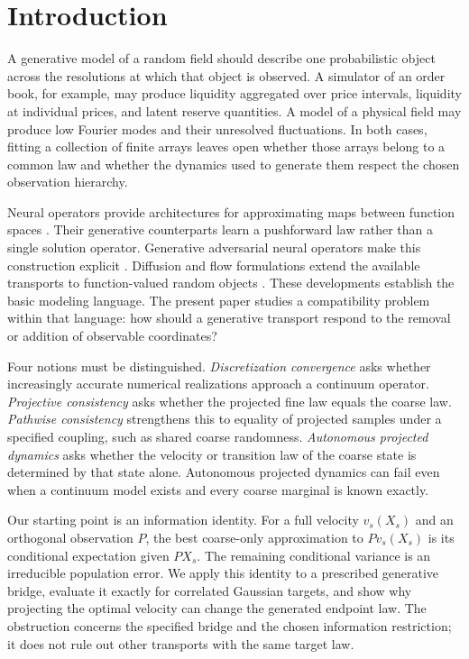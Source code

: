\section{Introduction}
A generative model of a random field should describe one probabilistic object across the resolutions at which that object is observed. A simulator of an order book, for example, may produce liquidity aggregated over price intervals, liquidity at individual prices, and latent reserve quantities. A model of a physical field may produce low Fourier modes and their unresolved fluctuations. In both cases, fitting a collection of finite arrays leaves open whether those arrays belong to a common law and whether the dynamics used to generate them respect the chosen observation hierarchy.

Neural operators provide architectures for approximating maps between function spaces \citep{kovachki2023}. Their generative counterparts learn a pushforward law rather than a single solution operator. Generative adversarial neural operators make this construction explicit \citep{rahman2022}. Diffusion and flow formulations extend the available transports to function-valued random objects \citep{pidstrigach2025,lim2025,kerrigan2024functional}. These developments establish the basic modeling language. The present paper studies a compatibility problem within that language: how should a generative transport respond to the removal or addition of observable coordinates?

Four notions must be distinguished. \emph{Discretization convergence} asks whether increasingly accurate numerical realizations approach a continuum operator. \emph{Projective consistency} asks whether the projected fine law equals the coarse law. \emph{Pathwise consistency} strengthens this to equality of projected samples under a specified coupling, such as shared coarse randomness. \emph{Autonomous projected dynamics} asks whether the velocity or transition law of the coarse state is determined by that state alone. Autonomous projected dynamics can fail even when a continuum model exists and every coarse marginal is known exactly.

Our starting point is an information identity. For a full velocity $v_s(X_s)$ and an orthogonal observation $P$, the best coarse-only approximation to $Pv_s(X_s)$ is its conditional expectation given $PX_s$. The remaining conditional variance is an irreducible population error. We apply this identity to a prescribed generative bridge, evaluate it exactly for correlated Gaussian targets, and show why projecting the optimal velocity can change the generated endpoint law. The obstruction concerns the specified bridge and the chosen information restriction; it does not rule out other transports with the same target law.

